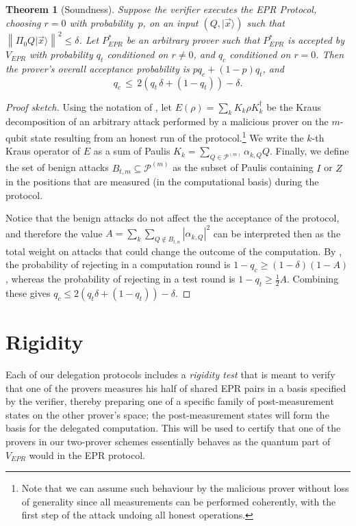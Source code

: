 \documentclass[11pt]{article}
\newtheorem{theorem}{Theorem}
\newcommand{\ket}[1]{|#1\rangle}
\newcommand{\norm}[1]{\left\|#1\right\|}
\newcommand{\paulin}{\mathcal{P}^{(m)}\!}
\begin{document}
\begin{theorem}[Soundness]\label{thm:EPR-soundness} 
Suppose the verifier executes the EPR Protocol, choosing $r=0$ with probability~$p$, on an input $(Q,\ket{\vec{x}})$ such that $\norm{\Pi_0 Q\ket{\vec{x}}}^2\leq \delta$. Let $P_{EPR}^*$ be an arbitrary prover such that $P_{EPR}^*$ is accepted by  $V_{EPR}$ with probability $q_t$ conditioned on $r\neq 0$, and $q_c$ conditioned on $r=0$. Then the prover's overall acceptance probability is $pq_c+(1-p)q_t$, and
$$q_c \,\leq\, 2\left(q_t\,\delta+(1-q_t)\right)-\delta.$$ 
\end{theorem}
\begin{proof}[Proof sketch]
Using the notation of \cite{broadbent15howtoverify}, let $E(\rho) = \sum_{k} K_k \rho K_k^\dagger$ be the Kraus decomposition of an arbitrary attack  performed by a malicious prover on the $m$-qubit state resulting from an honest run of the protocol.\footnote{Note that we can assume such behaviour by the malicious prover without loss of generality since  all measurements can be performed coherently, with the first step of the attack undoing all honest operations.}  We write the $k$-th Kraus operator of $E$ as a sum of Paulis $K_k = \sum_{Q\in
  \paulin} \alpha_{k,Q} Q$. Finally, we define the set of benign attacks $B_{t,m} \subseteq \paulin$ as the subset of Paulis containing $I$ or $Z$ in the positions that are measured (in the computational basis) during the protocol.
  
  Notice that the benign attacks do not affect the the acceptance of the protocol, and therefore the value 
$A=\sum_k\sum_{Q 
\not\in
  B_{t,n}}|\alpha_{k,Q}|^2$ can be interpreted then as the total weight on attacks that could change the outcome of the computation. By \cite{broadbent15howtoverify}, the probability of rejecting in a computation round is $1-q_c\geq (1-\delta)(1-A)$, whereas the probability of rejecting in a test round is $1-q_t\geq \frac{1}{2}A$. Combining these gives $q_c\leq 2(q_t\delta+(1-q_t))-\delta$.
\end{proof}







\section{Rigidity}
\label{sec:intro-rigidity}

Each of our delegation protocols includes a \emph{rigidity test} that is meant to verify that one of the provers measures his half of shared EPR pairs in a basis specified by the verifier, thereby preparing one of a specific family of post-measurement states on the other prover's space; the post-measurement states will form the basis for the delegated computation. This will be used to certify that one of the provers in our two-prover schemes essentially behaves as the quantum part of $V_{EPR}$ would in the EPR protocol. 
\end{document}
